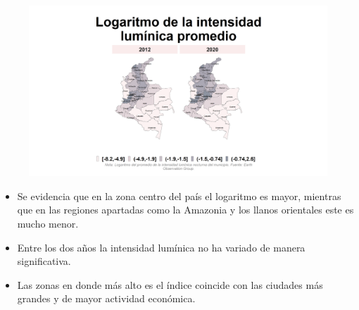     \begin{figure}[H]
        \caption[Logaritmo de la intensidad lumínica promedio por departamentos (mapa) - 2012 VS 2020 ]{\label{log_lumicidad_dptos_mapa} }
        \begin{center}
        \includegraphics[width=\textwidth,keepaspectratio]{img/var_301_map.png}
        \end{center}
    \end{figure}
            \begin{itemize}
                    \item Se evidencia que en la zona centro del país el logaritmo es mayor, mientras que en las regiones apartadas como la Amazonia y los llanos orientales este es mucho menor.
                    \item Entre los dos años la intensidad lumínica no ha variado de manera significativa.
                    \item Las zonas en donde más alto es el índice coincide con las ciudades más grandes y de mayor actividad económica.
                    \end{itemize}

